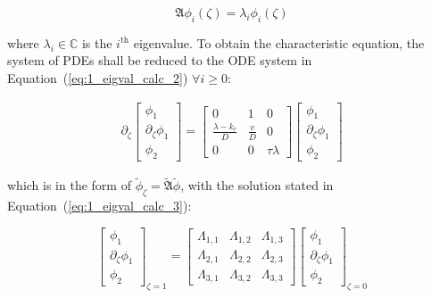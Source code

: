 \begin{equation} \label{eq:1_eig_prob}
        \mathfrak{A} {\phi_i}(\zeta) = \lambda_i {\phi_i}(\zeta)
\end{equation}


where $\lambda_i \in \mathbb{C}$ is the $i^{\text{th}}$ eigenvalue. To obtain the characteristic equation, the system of PDEs shall be reduced to the ODE system in Equation~(\ref{eq:1_eigval_calc_2}) $\forall i \geq 0$:

\begin{equation} \label{eq:1_eigval_calc_2}
    \begin{aligned}
        \partial_\zeta \begin{bmatrix}
            \phi_1 \\ \partial_\zeta \phi_1 \\ \phi_2
        \end{bmatrix} = \begin{bmatrix}
            0 & 1 & 0 \\
            \frac{\lambda-k_r}{D} & \frac{v}{D} & 0 \\
            0 & 0 & \tau \lambda 
        \end{bmatrix} \begin{bmatrix}
            \phi_1 \\ \partial_\zeta \phi_1 \\ \phi_2
        \end{bmatrix}
    \end{aligned}
\end{equation}

which is in the form of $ \tilde{{\phi}}_\zeta  = \tilde{\mathfrak{A}} \tilde{{\phi}}$, with the solution stated in Equation~(\ref{eq:1_eigval_calc_3}):

\begin{equation} \label{eq:1_eigval_calc_3}
    \begin{bmatrix}
        \phi_1 \\ \partial_\zeta \phi_1 \\ \phi_2
    \end{bmatrix}_{\zeta=1} = \begin{bmatrix}
        \Lambda_{1,1} & \Lambda_{1,2} & \Lambda_{1,3} \\
        \Lambda_{2,1} & \Lambda_{2,2} & \Lambda_{2,3} \\
        \Lambda_{3,1} & \Lambda_{3,2} & \Lambda_{3,3}
    \end{bmatrix} \begin{bmatrix}
        \phi_1 \\ \partial_\zeta \phi_1 \\ \phi_2
    \end{bmatrix}_{\zeta=0}
\end{equation}


